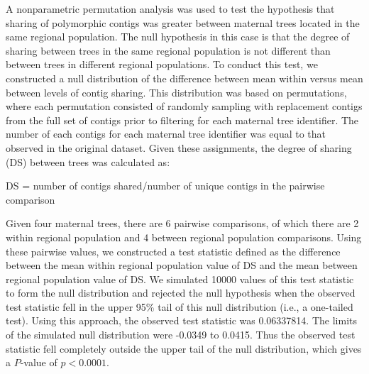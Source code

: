 \documentclass[smallextended]{svjour3}
\begin{document}
A nonparametric permutation analysis was used to test the hypothesis that
sharing of polymorphic contigs was greater between maternal trees located in the
same regional population. The null hypothesis in this case is that the degree of
sharing between trees in the same regional population is not different than
between trees in different regional populations. To conduct this test, we
constructed a null distribution of the difference between mean within versus
mean between levels of contig sharing. This distribution was based on
permutations, where each permutation consisted of randomly sampling with
replacement contigs from the full set of contigs prior to filtering for each
maternal tree identifier. The number of each contigs for each maternal tree
identifier was equal to that observed in the original dataset. Given these
assignments, the degree of sharing (DS) between trees was calculated as:

DS = number of contigs shared/number of unique contigs in the pairwise
comparison

Given four maternal trees, there are 6 pairwise comparisons, of which there are
2 within regional population and 4 between regional population
comparisons. Using these pairwise values, we constructed a test statistic
defined as the difference between the mean within regional population value of
DS and the mean between regional population value of DS. We simulated
\num{10000} values of this test statistic to form the null distribution and
rejected the null hypothesis when the observed test statistic fell in the upper
95\% tail of this null distribution (i.e., a one-tailed test). Using this
approach, the observed test statistic was 0.06337814. The limits of the
simulated null distribution were -0.0349 to 0.0415. Thus the observed test
statistic fell completely outside the upper tail of the null distribution, which
gives a $P$-value of $p < 0.0001$.
\end{document}
